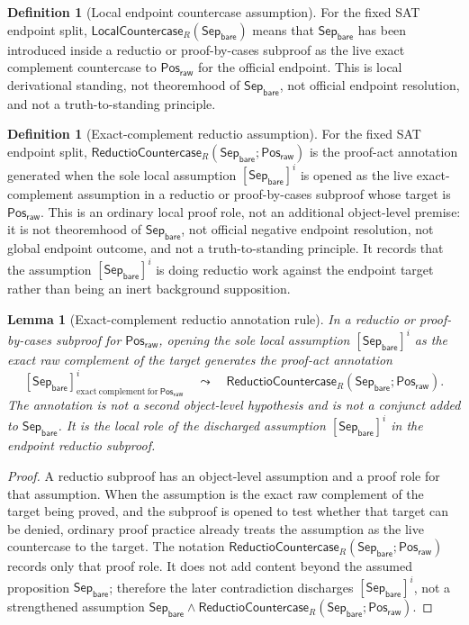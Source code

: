 \documentclass[11pt]{article}
\newtheorem{lemma}[theorem]{Lemma}
\theoremstyle{definition}
\newtheorem{definition}[theorem]{Definition}
\theoremstyle{remark}
\newcommand{\PosRaw}{\mathsf{Pos}_{\mathsf{raw}}}
\newcommand{\SepBare}{\mathsf{Sep}_{\mathsf{bare}}}
\newcommand{\LocalCountercase}{\mathsf{LocalCountercase}}
\newcommand{\ReductioCountercase}{\mathsf{ReductioCountercase}}
\begin{document}
\begin{definition}[Local endpoint countercase assumption]
\label{def:local-countercase-assumption}
For the fixed SAT endpoint split, \(\LocalCountercase_R(\SepBare)\) means that \(\SepBare\) has been introduced inside a reductio or proof-by-cases subproof as the live exact complement countercase to \(\PosRaw\) for the official endpoint. This is local derivational standing, not theoremhood of \(\SepBare\), not official endpoint resolution, and not a truth-to-standing principle.

\end{definition}

\begin{definition}[Exact-complement reductio assumption]
\label{def:exact-complement-reductio-assumption}
For the fixed SAT endpoint split, \(\ReductioCountercase_R(\SepBare;\PosRaw)\) is the proof-act annotation generated when the sole local assumption \([\SepBare]^i\) is opened as the live exact-complement assumption in a reductio or proof-by-cases subproof whose target is \(\PosRaw\). This is an ordinary local proof role, not an additional object-level premise: it is not theoremhood of \(\SepBare\), not official negative endpoint resolution, not global endpoint outcome, and not a truth-to-standing principle. It records that the assumption \([\SepBare]^i\) is doing reductio work against the endpoint target rather than being an inert background supposition.
\end{definition}

\begin{lemma}[Exact-complement reductio annotation rule]
\label{lem:exact-complement-reductio-annotation-rule}
In a reductio or proof-by-cases subproof for \(\PosRaw\), opening the sole local assumption \([\SepBare]^i\) as the exact raw complement of the target generates the proof-act annotation
\[
  [\SepBare]^i_{\mathrm{exact\ complement\ for}\ \PosRaw}
  \quad\leadsto\quad
  \ReductioCountercase_R(\SepBare;\PosRaw).
\]
The annotation is not a second object-level hypothesis and is not a conjunct added to \(\SepBare\). It is the local role of the discharged assumption \([\SepBare]^i\) in the endpoint reductio subproof.
\end{lemma}

\begin{proof}
A reductio subproof has an object-level assumption and a proof role for that assumption. When the assumption is the exact raw complement of the target being proved, and the subproof is opened to test whether that target can be denied, ordinary proof practice already treats the assumption as the live countercase to the target. The notation \(\ReductioCountercase_R(\SepBare;\PosRaw)\) records only that proof role. It does not add content beyond the assumed proposition \(\SepBare\); therefore the later contradiction discharges \([\SepBare]^i\), not a strengthened assumption \(\SepBare\wedge\ReductioCountercase_R(\SepBare;\PosRaw)\).
\end{proof}
\end{document}
